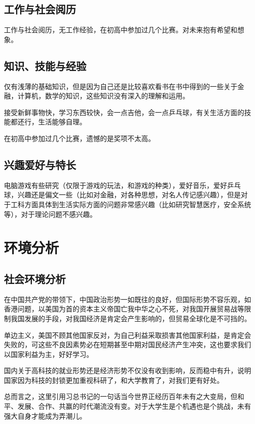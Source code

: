 \documentclass{article}
\begin{document}
\subsection{工作与社会阅历}
工作与社会阅历，无工作经验，在初高中参加过几个比赛。对未来抱有希望和想象。\par
\subsection{知识、技能与经验}
仅有浅薄的基础知识，但是因为自己还是比较喜欢看书在书中得到的一些关于金融，计算机，数学的知识，这些知识没有深入的理解和运用。 \par 接受新鲜事物快，学习东西较快，会一点吉他，会一点乒乓球，有关生活方面的技能都还行，生活能够自理。\par 在初高中参加过几个比赛，遗憾的是奖项不太高。\par
\subsection{兴趣爱好与特长}
电脑游戏有些研究（仅限于游戏的玩法，和游戏的种类），爱好音乐，爱好乒乓球，兴趣还是偏文一些（比如对金融，对各种思想，对名人传记感兴趣），但是对于工科方面具体到生活实际方面的问题非常感兴趣（比如研究智慧医疗，安全系统等），对于理论问题不感兴趣。\par
\section{环境分析}

\subsection{社会环境分析}
在中国共产党的带领下，中国政治形势一如既往的良好，但国际形势不容乐观，如香港问题，以美国为首的资本主义帝国亡我中华之心不死，对我国开展贸易战等限制我国发展的手段，对我国经济是肯定会产生影响的，但贸易全球化是不可挡的。\par 单边主义，美国不顾其他国家反对，为自己利益采取损害其他国家利益，是肯定会失败的，可这些不良因素势必在短期甚至中期对国民经济产生冲突，这也要求我们以国家利益为主，好好学习。\par  国内关于高科技的就业形势还是经济形势不仅没有收到影响，反而稳中有升，说明国家因为科技的封锁更加重视科研了，和大学教育了，对我们更有好处。\par 总而言之，这里引用习总书记的一句话当今世界正经历百年未有之大变局，但和平、发展、合作、共赢的时代潮流没有变。对于大学生是个机遇也是个挑战，未有强大自身才能成为弄潮儿。\par
\end{document}

